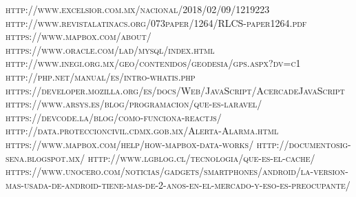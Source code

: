 \begin{thebibliography}{X}

 \textsc{http://www.excelsior.com.mx/nacional/2018/02/09/1219223}
 \textsc{http://www.revistalatinacs.org/073paper/1264/RLCS-paper1264.pdf}
 \textsc{https://www.mapbox.com/about/}
 \textsc{https://www.oracle.com/lad/mysql/index.html}
 \textsc{http://www.inegi.org.mx/geo/contenidos/geodesia/gps.aspx?dv=c1}
 \textsc{http://php.net/manual/es/intro-whatis.php}
 \textsc{https://developer.mozilla.org/es/docs/Web/JavaScript/AcercadeJavaScript}
 \textsc{https://www.arsys.es/blog/programacion/que-es-laravel/ }
 \textsc{https://devcode.la/blog/como-funciona-reactjs/ }
 \textsc{http://data.proteccioncivil.cdmx.gob.mx/Alerta-Alarma.html  }
 \textsc{https://www.mapbox.com/help/how-mapbox-data-works/  }
 \textsc{http://documentosig-sena.blogspot.mx/ }
 \textsc{http://www.lgblog.cl/tecnologia/que-es-el-cache/}
 \textsc{https://www.unocero.com/noticias/gadgets/smartphones/android/la-version-mas-usada-de-android-tiene-mas-de-2-anos-en-el-mercado-y-eso-es-preocupante/}
\end{thebibliography}